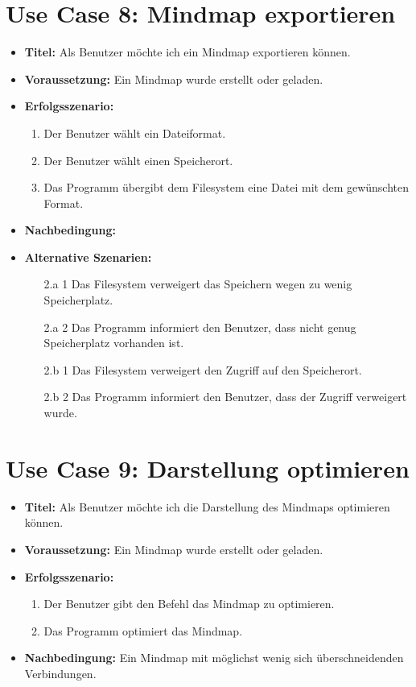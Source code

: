 \section*{Use Case 8: Mindmap exportieren}
\begin{itemize}
\item \textbf{Titel:} Als Benutzer möchte ich ein Mindmap exportieren können.
\item \textbf{Voraussetzung:} Ein Mindmap wurde erstellt oder geladen.
\item \textbf{Erfolgsszenario:}
	\begin{enumerate}
	\item Der Benutzer wählt ein Dateiformat.
	\item Der Benutzer wählt einen Speicherort.
	\item Das Programm übergibt dem Filesystem eine Datei mit dem gewünschten Format.
	\end{enumerate}
\item \textbf{Nachbedingung:}
\item \textbf{Alternative Szenarien:}
	\begin{enumerate}
	\item [2.a 1] Das Filesystem verweigert das Speichern wegen zu wenig Speicherplatz.
	\item [2.a 2] Das Programm informiert den Benutzer, dass nicht genug Speicherplatz vorhanden ist.
	\item []
	\item [2.b 1] Das Filesystem verweigert den Zugriff auf den Speicherort.
	\item [2.b 2] Das Programm informiert den Benutzer, dass der Zugriff verweigert wurde.
	\end{enumerate}
\end{itemize}

\section*{Use Case 9: Darstellung optimieren}
\begin{itemize}
\item \textbf{Titel:} Als Benutzer möchte ich die Darstellung des Mindmaps optimieren können.
\item \textbf{Voraussetzung:} Ein Mindmap wurde erstellt oder geladen.
\item \textbf{Erfolgsszenario:}
	\begin{enumerate}
	\item Der Benutzer gibt den Befehl das Mindmap zu optimieren.
	\item Das Programm optimiert das Mindmap.
	\end{enumerate}
\item \textbf{Nachbedingung:} Ein Mindmap mit möglichst wenig sich überschneidenden Verbindungen.
\end{itemize}
